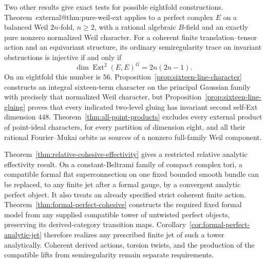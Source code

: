 \documentclass[11pt]{article}
\makeatletter
\providecommand{\compref}[1]{\csname external@#1\endcsname}
\theoremstyle{definition}
\theoremstyle{remark}
\makeatother
\begin{document}
Two other results give exact tests for possible eightfold constructions. Theorem~\compref{thm:pure-weil-ext} applies to a perfect complex $E$ on a balanced Weil $2n$-fold, $n\ge2$, with a rational algebraic $B$-field and an exactly pure nonzero normalized Weil character. For a coherent finite translation--tensor action and an equivariant structure, its ordinary semiregularity trace on invariant obstructions is injective if and only if
\[
 \dim\operatorname{Ext}^2(E,E)^G=2n(2n-1).
\]
On an eightfold this number is $56$. Proposition~\ref{prop:sixteen-line-character} constructs an integral sixteen-term character on the principal Gaussian family with precisely that normalized Weil character, but Proposition~\ref{prop:sixteen-line-gluing} proves that every indicated two-level gluing has invariant second self-Ext dimension $448$. Theorem~\ref{thm:all-point-products} excludes every external product of point-ideal characters, for every partition of dimension eight, and all their rational Fourier--Mukai orbits as sources of a nonzero full-family Weil component.


Theorem~\ref{thm:relative-cohesive-effectivity} gives a restricted
relative analytic effectivity result. On a constant-Beltrami family
of compact complex tori, a compatible formal flat superconnection
on one fixed bounded smooth bundle can be replaced, to any finite
jet after a formal gauge, by a convergent analytic perfect object.
It also treats an already specified strict coherent finite action.
Theorem~\ref{thm:formal-perfect-cohesive} constructs the required
fixed formal model from any supplied compatible tower of untwisted
perfect objects, preserving its derived-category transition maps.
Corollary~\ref{cor:formal-perfect-analytic-jet} therefore realizes
any prescribed finite jet of such a tower analytically. Coherent
derived actions, torsion twists, and the production of the compatible
lifts from semiregularity remain separate requirements.
\end{document}
